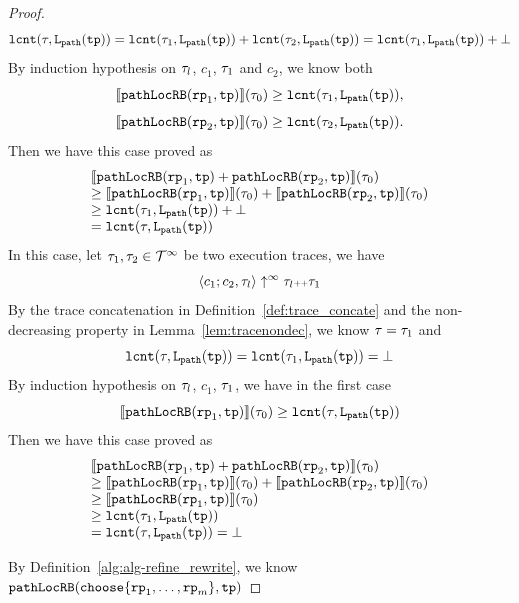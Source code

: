 \begin{proof}
\[
  \lcounter(\trace, \pathl(\tpath))  = 
  \lcounter(\trace_1,  \pathl(\tpath))  + \lcounter(\trace_2,  \pathl(\tpath)) = \lcounter(\trace_1,  \pathl(\tpath)) + \bot
\]
By induction hypothesis on $\trace_l$, $c_1$, $\trace_1$ and $c_2$, we know both
\[
  \econfig{\outinB(\rprog_1, \tpath)}(\trace_0) \geq \lcounter(\trace_1,  \pathl(\tpath)),
\] 
\[
  \econfig{\outinB(\rprog_2, \tpath)}(\trace_0)  \geq \lcounter(\trace_2,  \pathl(\tpath)).
\]
Then we have this case proved as
\[
  \begin{array}{l}
  \econfig{\outinB(\rprog_1, \tpath) + \outinB(\rprog_2, \tpath)}(\trace_0)
  \\
  \geq \econfig{\outinB(\rprog_1, \tpath)}(\trace_0) + \econfig{\outinB(\rprog_2, \tpath)}(\trace_0)
  \\
  \geq \lcounter(\trace_1,  \pathl(\tpath))  + \bot 
  \\
  = \lcounter(\trace, \pathl(\tpath))
  \end{array}
  \] 
  In this case, let $\trace_1, \trace_2 \in \inftdom$ be two execution traces, we have
  \[
    \config{c_1; c_2, \trace_l} \uparrow^{\infty} \trace_l \tracecat \trace_1
  \]
  By the trace concatenation in Definition~\ref{def:trace_concate} and the non-decreasing property in Lemma~\ref{lem:tracenondec}, we know $\trace = \trace_1$ and
  \[
    \lcounter(\trace, \pathl(\tpath))  = \lcounter(\trace_1, \pathl(\tpath))  = \bot
  \]
  By induction hypothesis on $\trace_l$, $c_1$, $\trace_1$, we have
  in the first case
  \[
    \econfig{\outinB(\rprog_1, \tpath)}(\trace_0) \geq \lcounter(\trace,  \pathl(\tpath)) 
  \]
  Then we have this case proved as
  \[
    \begin{array}{l}
    \econfig{\outinB(\rprog_1, \tpath) + \outinB(\rprog_2, \tpath)}(\trace_0)
    \\
    \geq \econfig{\outinB(\rprog_1, \tpath)}(\trace_0) + \econfig{\outinB(\rprog_2, \tpath)}(\trace_0)
    \\
    \geq \econfig{\outinB(\rprog_1, \tpath)}(\trace_0)
    \\
    \geq \lcounter(\trace_1,  \pathl(\tpath))
    \\
    = \lcounter(\trace, \pathl(\tpath))
    = \bot
    \end{array}
    \] 
   
By Definition~\ref{alg:alg-refine_rewrite}, we know 
 $\outinB(\rpchoose{\rprog_1, \ldots, \rprog_m }, \tpath)$
 

\end{proof}
